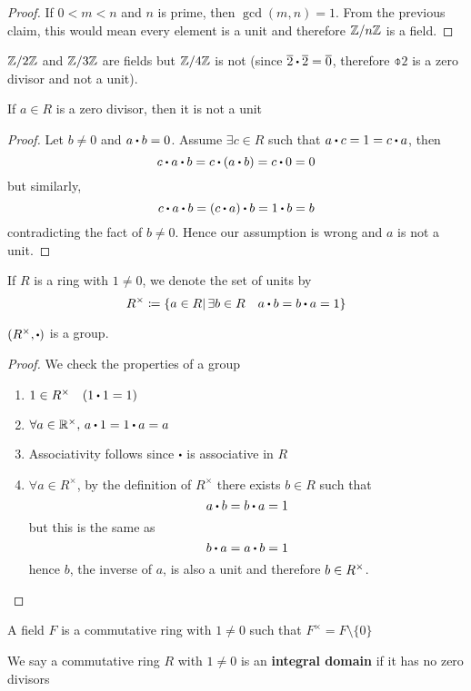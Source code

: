 \documentclass[../Main.tex]{subfiles}
\begin{document}
\begin{proof}
	If $0<m<n$ and $n$ is prime, then $\gcd(m,n)=1$. From the previous claim, this would mean every element is a unit and therefore $\mathbb{Z}/n\mathbb{Z}$ is a field.
\end{proof}
\begin{example}
	$\mathbb{Z}/2\mathbb{Z}$ and $\mathbb{Z}/3\mathbb{Z}$ are fields but $\mathbb{Z}/4\mathbb{Z}$ is not (since $\obar{2}\rdot \obar{2} = \obar{0}$, therefore $\obar{2}$ is a zero divisor and not a unit).
\end{example}
\newpage
\begin{claim}
	If $a\in R$ is a zero divisor, then it is not a unit
\end{claim}
\begin{proof}
	Let $b\ne 0$ and $a\rdot b=0$.\newline
	Assume $\exists c\in R$ such that $a\rdot c=1=c\rdot a$, then
	\[c\rdot a\rdot b=c\rdot (a\rdot b)=c\rdot 0=0\]
	but similarly,
	\[c\rdot a\rdot b=(c\rdot a)\rdot b=1\rdot b=b\]
	contradicting the fact of $b\ne0$. Hence our assumption is wrong and $a$ is not a unit.
\end{proof}
\begin{dfn}[title=Group of Units]
	If $R$ is a ring with $1\ne0$, we denote the set of units by 
	\[R^\times \coloneqq\{a\in R|\, \exists b\in R \quad a\rdot b=b\rdot a=1\}\]
\end{dfn}
\begin{claim}
	$(R^\times,\rdot )$ is a group.
\end{claim}
\begin{proof} We check the properties of a group
	\begin{enumerate}
		\item $1 \in R^\times \quad (1\rdot 1=1)$
		\item $\forall a \in \R^\times,\, a\rdot 1=1\rdot a=a$
		\item Associativity follows since $\rdot$ is associative in $R$
		\item $\forall a \in R^\times$, by the definition of $R^\times$ there exists $b\in R$ such that
		\[a\rdot b=b\rdot a=1\]
		but this is the same as
		\[b\rdot a=a\rdot b=1\]
		hence $b$, the inverse of $a$, is also a unit and therefore $b\in R^\times\qedhere$.
	\end{enumerate}
\end{proof}
A field $F$ is a commutative ring with $1\ne 0$ such that $F^\times = F \setminus\{0\}$
\begin{dfn}[title= Integral Domain]
	We say a commutative ring $R$ with $1\ne 0$ is an \textbf{integral domain} if it has no zero divisors
\end{dfn}
\end{document}
